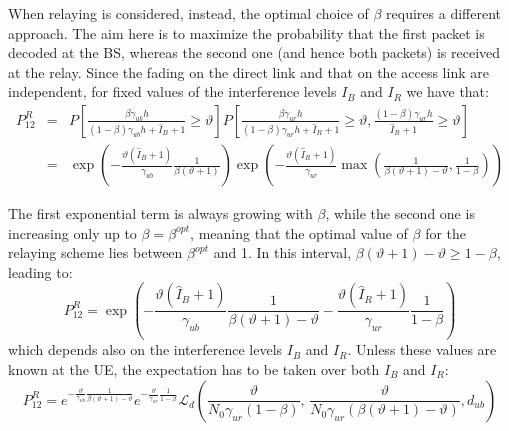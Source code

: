 \documentclass[12pt, letterpaper, onecolumn, draftcls]{IEEEtran}
\begin{document}
When relaying is considered, instead, the optimal choice of $\beta$ requires a different approach. The aim here is to maximize the probability that the first packet is decoded at the BS, whereas the second one (and hence both packets) is received at the relay. Since the fading on the direct link and that on the access link are independent, for fixed values of the interference levels $I_B$ and $I_R$ we have that:
\begin{eqnarray}
 P_{12}^R & = & P\left[\frac{\beta\gamma_{ub}h}{(1-\beta)\gamma_{ub}h+\hat{I}_B+1}\geq\vartheta\right]P\left[\frac{\beta\gamma_{ur}h}{(1-\beta)\gamma_{ur}h+\hat{I}_R+1}\geq\vartheta, \frac{(1-\beta)\gamma_{ur}h}{\hat{I}_R+1}\geq\vartheta\right]\nonumber\\
 & = & \exp\left(-\frac{\vartheta(\hat{I}_B+1)}{\gamma_{ub}}\frac{1}{\beta(\vartheta+1)}\right)\exp\left(-\frac{\vartheta(\hat{I}_R+1)}{\gamma_{ur}}\max\left(\frac{1}{\beta(\vartheta+1)-\vartheta},\frac{1}{1-\beta}\right)\right)
\end{eqnarray}

The first exponential term is always growing with $\beta$, while the second one is increasing only up to $\beta = \beta^{opt}$, meaning that the optimal value of $\beta$ for the relaying scheme lies between $\beta^{opt}$ and 1. In this interval, $\beta(\vartheta+1)-\vartheta\geq1-\beta$, leading to:
\begin{equation}
  P_{12}^R = \exp\left(-\frac{\vartheta(\hat{I}_B+1)}{\gamma_{ub}}\frac{1}{\beta(\vartheta+1)-\vartheta}-\frac{\vartheta(\hat{I}_R+1)}{\gamma_{ur}}\frac{1}{1-\beta}\right)
\end{equation}
which depends also on the interference levels $I_B$ and $I_R$. Unless these values are known at the UE, the expectation has to be taken over both $I_B$ and $I_R$:
\begin{equation}
 P_{12}^R = e^{-\frac{\vartheta}{\gamma_{ub}}\frac{1}{\beta(\vartheta+1)-\vartheta}} e^{-\frac{\vartheta}{\gamma_{ur}}\frac{1}{1-\beta}}\mathscr{L}_d\left(\frac{\vartheta}{N_0\gamma_{ur}(1-\beta)},\,\frac{\vartheta}{N_0\gamma_{ur}(\beta(\vartheta+1)-\vartheta)},d_{ub}\right)
 \label{valP12}
\end{equation}
\end{document}

